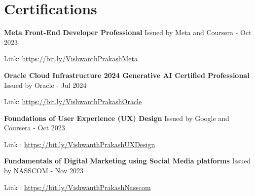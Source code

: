 \documentclass[10pt, letterpaper]{article}
\begin{document}
  \section{Certifications}
       
       \begin{samepage}
    \noindent
    \textbf{Meta Front-End Developer Professional} 
    \hfill 
    Issued by Meta and Coursera - Oct 2023
    
    \vspace{0.03 cm}
    
    \noindent
    Link: \href{https://bit.ly/VishwanthPrakashMeta}{https://bit.ly/VishwanthPrakashMeta}
\end{samepage}

\vspace{0.2 cm}

 \begin{samepage}
    \noindent
    \textbf{Oracle Cloud Infrastructure 2024 Generative AI Certified Professional  } 
    \hfill 
    Issued by Oracle - Jul 2024 
    
    \vspace{0.03 cm}
    
    \noindent
   Link: \href{https://bit.ly/VishwanthPrakashOracle }{https://bit.ly/VishwanthPrakashOracle }
\end{samepage}

\vspace{0.2 cm}

 \begin{samepage}
    \noindent
   \textbf{Foundations of User Experience (UX) Design} 
    \hfill 
    Issued by Google and Coursera - Oct 2023\textbf{ }
    
    \vspace{0.03 cm}
    
    \noindent
   Link : \href{https://bit.ly/VishwanthPrakashUXDesign}{https://bit.ly/VishwanthPrakashUXDesign }
\end{samepage}

\vspace{0.2 cm}

 \begin{samepage}
    \noindent
   \textbf{Fundamentals of Digital Marketing using Social Media platforms} 
    \hfill 
    Issued by NASSCOM - Nov 2023\textbf{ }
    
    \vspace{0.03 cm}
    
    \noindent
   Link : \href{https://bit.ly/VishwanthPrakashNasscom }{https://bit.ly/VishwanthPrakashNasscom }
\end{samepage}
\end{document}
